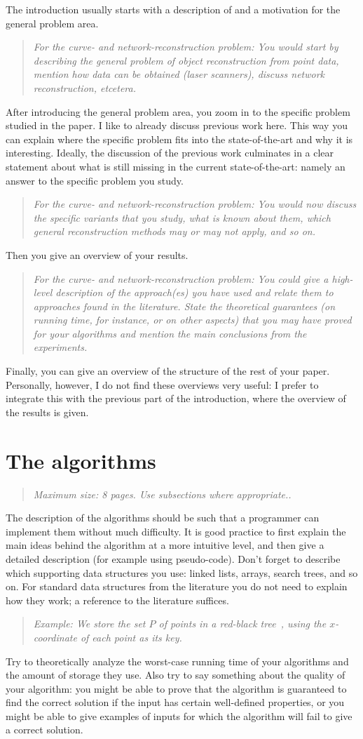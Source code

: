 \documentclass[11pt]{article}
\newcommand{\maxsize}[1]{\begin{quotation} {\sl \noindent Maximum size: #1.} \end{quotation}}
\newcommand{\crp}[1]{\begin{quotation} {\sl \noindent For the curve- and network-reconstruction problem: #1} \end{quotation}}
\newcommand{\example}[1]{\begin{quotation} {\sl \noindent Example: #1} \end{quotation}}
\begin{document}

The introduction usually starts with a description of and
a motivation for the general problem area.
%
\crp{You would start by
describing the general problem of object reconstruction from point data,
mention how data can be obtained (laser scanners), discuss network reconstruction, etcetera.}
%
After introducing the general problem area, you zoom in to the specific problem
studied in the paper. I like to already discuss previous work here. This way
you can explain where the specific problem fits into the state-of-the-art
and why it is interesting. Ideally, the discussion of the previous work
culminates in a clear statement about what is still missing in the current
state-of-the-art: namely an answer to the specific problem you study.
%
\crp{You would now discuss the specific variants that you study, 
what is known about them, which general reconstruction methods may or may not apply, and so on.}
%
Then you give an overview of your results.
%
\crp{You could give a high-level description of the
approach(es) you have used and relate them to approaches found in the literature.
State the theoretical guarantees (on running time,
for instance, or on other aspects) that you may have proved for your algorithms
and mention the main conclusions from the experiments.}
%
Finally, you can give an overview of the structure of the rest of your paper.
Personally, however, I do not find these overviews very useful: I prefer to
integrate this with the previous part of the introduction, where the overview
of the results is given.


\section{The algorithms}
\label{se:algorithms}
\maxsize{8 pages. Use subsections where appropriate.}

The description of the algorithms should be such that a programmer can
implement them without much difficulty. It is good practice to first explain the
main ideas behind the algorithm at a more intuitive level, and then give a
detailed description (for example using pseudo-code).
Don't forget to describe which supporting data structures you use:
linked lists, arrays, search trees, and so on. For standard data structures
from the literature you do not need to explain how they work; a reference
to the literature suffices.
%
\example{We store the set $P$ of points in a red-black tree~\cite{clrs-ia-01},
         using the $x$-coordinate of each point as its key.}
%
Try to theoretically analyze the worst-case running time of your algorithms
and the amount of storage they use. Also try to say something about the quality of your algorithm: you might
be able to prove that the algorithm is guaranteed to find the correct solution if the
input has certain well-defined properties, or you might be able to give examples
of inputs for which the algorithm will fail to give a correct solution.
\end{document}

